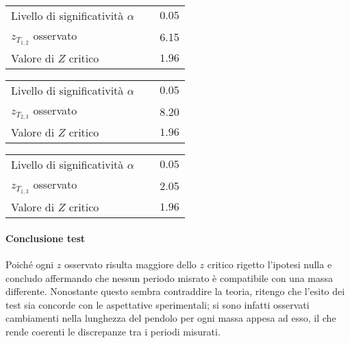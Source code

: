 \documentclass{article}
\begin{document}
		\vspace{0.7cm}
	\begin{minipage}{0.5\textwidth}
		\begin{table}[H]
			\centering
			\begin{tabular}{lr} 
				Livello di significatività $\alpha$		&$\quad 0.05$  \\
				$z_{T_{1,2}}$ osservato 					& $\quad$ 6.15 \\
				Valore di $Z$ critico     	& $\quad 1.96$
			\end{tabular}
		\end{table}
	\end{minipage}
	\begin{minipage}{0.5\textwidth}
		\begin{table}[H]
			\centering
			\begin{tabular}{lr} 
				Livello di significatività $\alpha$		&$\quad 0.05$  \\
				$z_{T_{2,3}}$ osservato 					& $\quad$ 8.20 \\
				Valore di $Z$ critico     	& $\quad 1.96$
			\end{tabular}
		\end{table}
	\end{minipage}
	\begin{table}[H]
		\centering
		\begin{tabular}{lr} 
			Livello di significatività $\alpha$		&$\quad 0.05$  \\
			$z_{T_{1,3}}$ osservato 					& $\quad$ 2.05 \\
			Valore di $Z$ critico     	& $\quad 1.96$
		\end{tabular}
	\end{table}
	
	\paragraph{Conclusione test} Poiché ogni $z$ osservato risulta maggiore dello $z$ critico rigetto l'ipotesi nulla e concludo affermando che nessun periodo misrato è compatibile con una massa differente. Nonostante questo sembra contraddire la teoria, ritengo che l'esito dei test sia concorde con le aspettative sperimentali; si sono infatti osservati cambiamenti nella lunghezza del pendolo per ogni massa appesa ad esso, il che rende coerenti le discrepanze tra i periodi misurati.
	
	
\end{document}
